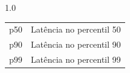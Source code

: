 
\listadesimbolos%

\begin{Spacing}{1.0}
\noindent
\begin{tabular}{@{}p{25mm}@{}p{135mm}@{}}
p50 & Latência no percentil 50 \\
p90 & Latência no percentil 90 \\
p99 & Latência no percentil 99 \\
\end{tabular}
\end{Spacing}

